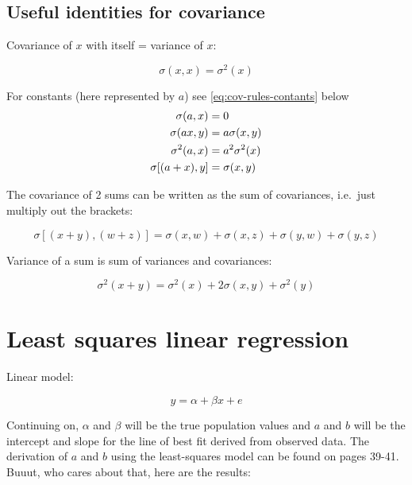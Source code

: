 \documentclass[
]{book}
\begin{document}
\hypertarget{useful-identities-for-covariance}{%
\subsection{Useful identities for covariance}\label{useful-identities-for-covariance}}

Covariance of \(x\) with itself = variance of \(x\):

\begin{equation}
    \sigma(x, x) = \sigma^2(x)
    \label{eq:covxx}
\end{equation}

For constants (here represented by \(a\)) see \eqref{eq:cov-rules-contants} below
\begin{align}
    \sigma(a, x) &= 0 \notag \\
    \sigma(ax, y) &= a\sigma(x, y) \notag \\
    \sigma^2(a, x) &= a^2\sigma^2(x) \notag \\
    \sigma[(a + x), y] &= \sigma(x, y) 
    \label{eq:cov-rules-contants}
\end{align}

The covariance of 2 sums can be written as the sum of covariances, i.e.~just multiply out the brackets:

\begin{equation}
  \sigma[(x + y),(w + z)] = \sigma(x, w) + \sigma(x, z) + \sigma(y, w) + \sigma(y, z) 
  \label{eq:cov-of-two-sums}
\end{equation}

Variance of a sum is sum of variances and covariances:

\begin{equation}
  \sigma^2(x + y) = \sigma^2(x) + 2\sigma(x, y) + \sigma^2(y)
  \label{eq:var-of-sum}  
\end{equation}

\hypertarget{least-squares-linear-regression}{%
\section{Least squares linear regression}\label{least-squares-linear-regression}}

Linear model:

\begin{equation}
  y = \alpha + \beta{x} + e
  \label{eq:simple-linear-model}  
\end{equation}

Continuing on, \(\alpha\) and \(\beta\) will be the true population values and \(a\) and \(b\) will be the intercept and slope for the line of best fit derived from observed data. The derivation of \(a\) and \(b\) using the least-squares model can be found on pages 39-41. Buuut, who cares about that, here are the results:
\end{document}
